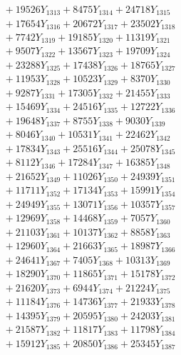 \documentclass[a4paper,10pt]{article}
\begin{document}
{\begin{align}
&\;  + 19526 Y_{1313} + 8475 Y_{1314} + 24718 Y_{1315} \\[0.3ex]
&\;  + 17654 Y_{1316} + 20672 Y_{1317} + 23502 Y_{1318} \\[0.5ex]\allowbreak
&\;  + 7742 Y_{1319} + 19185 Y_{1320} + 11319 Y_{1321} \\[0.3ex]
&\;  + 9507 Y_{1322} + 13567 Y_{1323} + 19709 Y_{1324} \\[0.3ex]
&\;  + 23288 Y_{1325} + 17438 Y_{1326} + 18765 Y_{1327} \\[0.3ex]
&\;  + 11953 Y_{1328} + 10523 Y_{1329} + 8370 Y_{1330} \\[0.3ex]
&\;  + 9287 Y_{1331} + 17305 Y_{1332} + 21455 Y_{1333} \\[0.3ex]
&\;  + 15469 Y_{1334} + 24516 Y_{1335} + 12722 Y_{1336} \\[0.3ex]
&\;  + 19648 Y_{1337} + 8755 Y_{1338} + 9030 Y_{1339} \\[0.3ex]
&\;  + 8046 Y_{1340} + 10531 Y_{1341} + 22462 Y_{1342} \\[0.3ex]
&\;  + 17834 Y_{1343} + 25516 Y_{1344} + 25078 Y_{1345} \\[0.3ex]
&\;  + 8112 Y_{1346} + 17284 Y_{1347} + 16385 Y_{1348} \\[0.5ex]\allowbreak
&\;  + 21652 Y_{1349} + 11026 Y_{1350} + 24939 Y_{1351} \\[0.3ex]
&\;  + 11711 Y_{1352} + 17134 Y_{1353} + 15991 Y_{1354} \\[0.3ex]
&\;  + 24949 Y_{1355} + 13071 Y_{1356} + 10357 Y_{1357} \\[0.3ex]
&\;  + 12969 Y_{1358} + 14468 Y_{1359} + 7057 Y_{1360} \\[0.3ex]
&\;  + 21103 Y_{1361} + 10137 Y_{1362} + 8858 Y_{1363} \\[0.3ex]
&\;  + 12960 Y_{1364} + 21663 Y_{1365} + 18987 Y_{1366} \\[0.3ex]
&\;  + 24641 Y_{1367} + 7405 Y_{1368} + 10313 Y_{1369} \\[0.3ex]
&\;  + 18290 Y_{1370} + 11865 Y_{1371} + 15178 Y_{1372} \\[0.3ex]
&\;  + 21620 Y_{1373} + 6944 Y_{1374} + 21224 Y_{1375} \\[0.3ex]
&\;  + 11184 Y_{1376} + 14736 Y_{1377} + 21933 Y_{1378} \\[0.5ex]\allowbreak
&\;  + 14395 Y_{1379} + 20595 Y_{1380} + 24203 Y_{1381} \\[0.3ex]
&\;  + 21587 Y_{1382} + 11817 Y_{1383} + 11798 Y_{1384} \\[0.3ex]
&\;  + 15912 Y_{1385} + 20850 Y_{1386} + 25345 Y_{1387} \\[0.3ex]

\end{align}}
\end{document}
